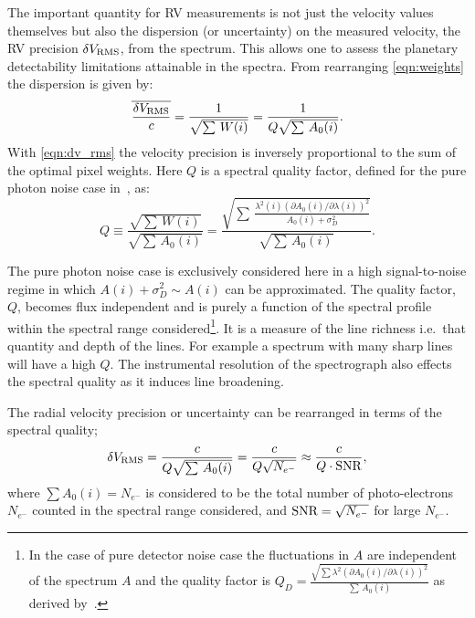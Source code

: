The important quantity for {RV} measurements is not just the velocity values themselves but also the dispersion (or uncertainty) on the measured velocity, the {RV} precision \(\delta V_{\textrm{RMS}}\), from the spectrum.
This allows one to assess the planetary detectability limitations attainable in the spectra.
From rearranging \cref{eqn:weights} the dispersion is given by:
\begin{equation}
\overline{\frac{\delta V_{\textrm{RMS}}}{c}} = \frac{1}{\sqrt{\sum{\,W(i)}}} = \frac{1}{Q \sqrt{\sum{\,{A}_{0}(i)}}}.\label{eqn:dv_rms}
\end{equation}
With \cref{eqn:dv_rms} the velocity precision is inversely proportional to the sum of the optimal pixel weights.
Here \(Q\) is a spectral quality factor, defined for the pure photon noise case in~\citet{connes_absolute_1985, connes_demonstration_1996}, as:
\begin{equation}
Q \equiv \frac{\sqrt{\sum{\,W(i)}}}{\sqrt{\sum{\,{A}_{0}(i)}}} = \frac{\sqrt{\sum{\,\frac{{\lambda}^{2}(i) {({\partial {A}_{0}(i)}/{\partial \lambda(i)})}^{2}}{A_0(i) + {\sigma}^{2}_{D}}}}}{\sqrt{\sum{\,{A}_{0}(i)}}}. \label{eqn:quality_factor}
\end{equation}

The pure photon noise case is exclusively considered here in a high signal-to-noise regime in which \({A(i) + \sigma_{D}^{2}} \sim {A(i)}\) can be approximated.
The quality factor, \(Q\), becomes flux independent and is purely a function of the spectral profile within the spectral range considered\footnote{In the case of pure detector noise case the fluctuations in \(A\) are independent of the spectrum \(A\) and the quality factor is \({Q}_{D} = \frac{\sqrt{\sum{{\lambda}^{2} {(\partial {A}_{0}(i)/\partial \lambda(i))}^{2}}}}{\sum{\, {A}_{0}(i)}}\) as derived by~\citet{connes_absolute_1985}.}.
It is a measure of the line richness i.e.\ that quantity and depth of the lines.
For example a spectrum with many sharp lines will have a high \(Q\).
The instrumental resolution of the spectrograph also effects the spectral quality as it induces line broadening.

The radial velocity precision or uncertainty can be rearranged in terms of the spectral quality;
\begin{equation}
\delta V_{\textrm{RMS}} = \frac{c}{Q \sqrt{\sum {\,{A}_{0}(i)}}} = \frac{c}{Q \sqrt{{N}_{{e}^{-}}}} \approx \frac{c}{Q \cdot \textrm{SNR}{}},  \label{eqn:snr_relation}
\end{equation}
where \(\sum {A}_{0}(i) = {N}_{{e}^{-}}\) is considered to be the total number of photo-electrons \({N}_{{e}^{-}}\) counted in the spectral range considered, and \(\textrm{SNR}{}=\sqrt{N_{{e}^{-}}}\) for large \(N_{{e}^{-}}\).

